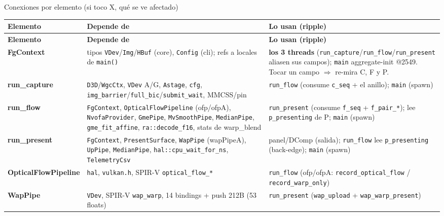 \documentclass[aspectratio=169]{beamer}
\newcommand{\Lcore}[1]{\textcolor{coreCol}{\textbf{#1}}}
\newcommand{\Lcap}[1]{\textcolor{capCol}{\textbf{#1}}}
\newcommand{\Lflow}[1]{\textcolor{flowCol}{\textbf{#1}}}
\newcommand{\Lwarp}[1]{\textcolor{warpCol}{\textbf{#1}}}
\newcommand{\Lpres}[1]{\textcolor{presCol}{\textbf{#1}}}
\newcommand{\Lfw}[1]{\textcolor{fwCol}{\textbf{#1}}}
\begin{document}
\begin{frame}[allowframebreaks]{Conexiones por elemento (si toco X, qu\'e se ve afectado)}
\scriptsize
\setlength{\tabcolsep}{3pt}
\renewcommand{\arraystretch}{1.18}
\begin{longtable}{p{2.2cm} p{5.0cm} p{4.6cm}}
\toprule
\textbf{Elemento} & \textbf{Depende de} & \textbf{Lo usan (ripple)} \\
\midrule
\endfirsthead
\toprule
\textbf{Elemento} & \textbf{Depende de} & \textbf{Lo usan (ripple)} \\
\midrule
\endhead
\bottomrule
\endfoot

\Lcore{FgContext} &
tipos \texttt{VDev}/\texttt{Img}/\texttt{HBuf} (core), \texttt{Config} (cli); refs a locales de \texttt{main()} &
\textbf{los 3 threads} (\texttt{run\_capture}/\texttt{run\_flow}/\texttt{run\_present} aliasen sus campos); \texttt{main} aggregate-init @2549. Tocar un campo $\Rightarrow$ re-mira C, F y P. \\

\Lcap{run\_capture} &
\texttt{D3D}/\texttt{WgcCtx}, \texttt{VDev} A/G, \texttt{Astage}, \texttt{cfg}, \texttt{img\_barrier}/\texttt{full\_bic}/\texttt{submit\_wait}, MMCSS/pin &
\texttt{run\_flow} (consume \texttt{c\_seq} + el anillo); \texttt{main} (spawn) \\

\Lflow{run\_flow} &
\texttt{FgContext}, \texttt{OpticalFlowPipeline} (ofp/ofpA), \texttt{NvofaProvider}, \texttt{GmePipe}, \texttt{MvSmoothPipe}, \texttt{MedianPipe}, \texttt{gme\_fit\_affine}, \texttt{ra::decode\_f16}, stats de warp\_blend &
\texttt{run\_present} (consume \texttt{f\_seq} + \texttt{f\_pair\_*}); lee \texttt{p\_presenting} de P; \texttt{main} (spawn) \\

\Lpres{run\_present} &
\texttt{FgContext}, \texttt{PresentSurface}, \texttt{WapPipe} (wapPipeA), \texttt{UpPipe}, \texttt{MedianPipe}, \texttt{hal::cpu\_wait\_for\_ns}, \texttt{TelemetryCsv} &
panel/DComp (salida); \texttt{run\_flow} lee \texttt{p\_presenting} (back-edge); \texttt{main} (spawn) \\

\Lfw{OpticalFlowPipeline} &
\texttt{hal}, \texttt{vulkan.h}, SPIR-V \texttt{optical\_flow\_*} &
\texttt{run\_flow} (ofp/ofpA: \texttt{record\_optical\_flow} / \texttt{record\_warp\_only}) \\

\Lwarp{WapPipe} &
\texttt{VDev}, SPIR-V \texttt{wap\_warp}, 14 bindings + push 212B (53 floats) &
\texttt{run\_present} (\texttt{wap\_upload} + \texttt{wap\_warp\_present}) \\


\end{longtable}
\end{frame}
\end{document}
